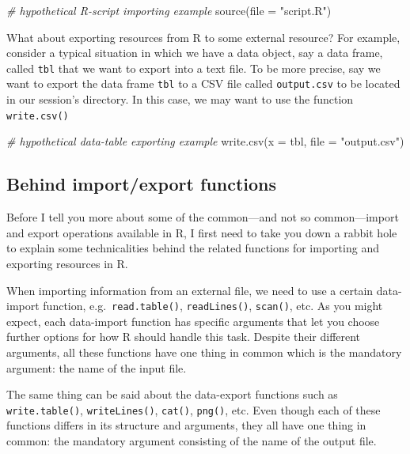 \documentclass[
]{book}
\newenvironment{Shaded}{\begin{snugshade}}{\end{snugshade}}
\newcommand{\AttributeTok}[1]{\textcolor[rgb]{0.77,0.63,0.00}{#1}}
\newcommand{\CommentTok}[1]{\textcolor[rgb]{0.56,0.35,0.01}{\textit{#1}}}
\newcommand{\FunctionTok}[1]{\textcolor[rgb]{0.00,0.00,0.00}{#1}}
\newcommand{\NormalTok}[1]{#1}
\newcommand{\StringTok}[1]{\textcolor[rgb]{0.31,0.60,0.02}{#1}}
\begin{document}
\begin{Shaded}
\begin{Highlighting}[]
\CommentTok{\# hypothetical R{-}script importing example}
\FunctionTok{source}\NormalTok{(}\AttributeTok{file =} \StringTok{"script.R"}\NormalTok{)}
\end{Highlighting}
\end{Shaded}

What about exporting resources from R to some external resource? For example,
consider a typical situation in which we have a data object, say a data frame,
called \texttt{tbl} that we want to export into a text file. To be more precise, say
we want to export the data frame \texttt{tbl} to a CSV file called \texttt{output.csv} to be
located in our session's directory. In this case, we may want to use the
function \texttt{write.csv()}

\begin{Shaded}
\begin{Highlighting}[]
\CommentTok{\# hypothetical data{-}table exporting example}
\FunctionTok{write.csv}\NormalTok{(}\AttributeTok{x =}\NormalTok{ tbl, }\AttributeTok{file =} \StringTok{"output.csv"}\NormalTok{)}
\end{Highlighting}
\end{Shaded}

\hypertarget{behind-importexport-functions}{%
\subsection{Behind import/export functions}\label{behind-importexport-functions}}

Before I tell you more about some of the common---and not so common---import
and export operations available in R, I first need to take you down a rabbit
hole to explain some technicalities behind the related functions for importing
and exporting resources in R.

When importing information from an external file, we need to use a
certain data-import function, e.g.~\texttt{read.table()}, \texttt{readLines()},
\texttt{scan()}, etc. As you might expect, each data-import function has specific
arguments that let you choose further options for how R should handle this
task. Despite their different arguments, all these functions have one thing in
common which is the mandatory argument: the name of the input file.

The same thing can be said about the data-export functions such as \texttt{write.table()},
\texttt{writeLines()}, \texttt{cat()}, \texttt{png()}, etc. Even though each of these functions
differs in its structure and arguments, they all have one thing in common:
the mandatory argument consisting of the name of the output file.
\end{document}
